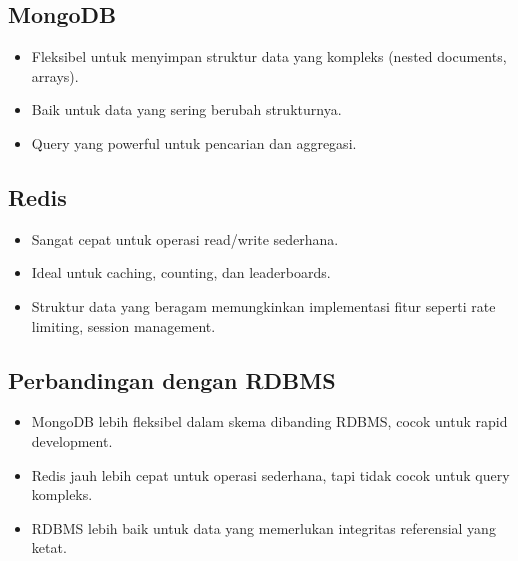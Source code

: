 \subsection{MongoDB}
\begin{itemize}
    \item Fleksibel untuk menyimpan struktur data yang kompleks (nested documents, arrays).
    \item Baik untuk data yang sering berubah strukturnya.
    \item Query yang powerful untuk pencarian dan aggregasi.
\end{itemize}

\subsection{Redis}
\begin{itemize}
    \item Sangat cepat untuk operasi read/write sederhana.
    \item Ideal untuk caching, counting, dan leaderboards.
    \item Struktur data yang beragam memungkinkan implementasi fitur seperti rate limiting, session management.
\end{itemize}

\subsection{Perbandingan dengan RDBMS}
\begin{itemize}
    \item MongoDB lebih fleksibel dalam skema dibanding RDBMS, cocok untuk rapid development.
    \item Redis jauh lebih cepat untuk operasi sederhana, tapi tidak cocok untuk query kompleks.
    \item RDBMS lebih baik untuk data yang memerlukan integritas referensial yang ketat.
\end{itemize}